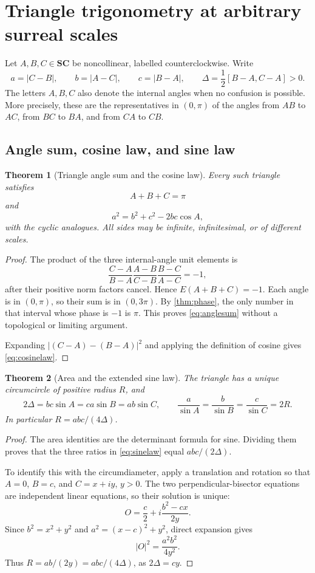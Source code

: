 \documentclass[11pt,letterpaper]{article}
\newtheorem{theorem}{Theorem}[section]
\theoremstyle{definition}
\theoremstyle{remark}
\newcommand{\SC}{\mathbf{SC}}
\numberwithin{equation}{section}
\begin{document}
\section{Triangle trigonometry at arbitrary surreal scales}\label{sec:triangles}
Let $A,B,C\in\SC$ be noncollinear, labelled counterclockwise. Write
\[
 a=|C-B|,\qquad b=|A-C|,\qquad c=|B-A|,
 \qquad \Delta=\frac12[B-A,C-A]>0.
\]
The letters $A,B,C$ also denote the internal angles when no confusion is possible. More precisely, these are the representatives in $(0,\pi)$ of the angles from $AB$ to $AC$, from $BC$ to $BA$, and from $CA$ to $CB$.

\subsection{Angle sum, cosine law, and sine law}
\begin{theorem}[Triangle angle sum and the cosine law]\label{thm:triangle}
Every such triangle satisfies
\begin{equation}\label{eq:anglesum}
 A+B+C=\pi
\end{equation}
and
\begin{equation}\label{eq:cosinelaw}
 a^2=b^2+c^2-2bc\cos A,
\end{equation}
with the cyclic analogues. All sides may be infinite, infinitesimal, or of different scales.
\end{theorem}
\begin{proof}
The product of the three internal-angle unit elements is
\[
 \frac{C-A}{B-A}\frac{A-B}{C-B}\frac{B-C}{A-C}=-1,
\]
after their positive norm factors cancel. Hence $E(A+B+C)=-1$. Each angle is in $(0,\pi)$, so their sum is in $(0,3\pi)$. By \cref{thm:phase}, the only number in that interval whose phase is $-1$ is $\pi$. This proves \eqref{eq:anglesum} without a topological or limiting argument.

Expanding $|(C-A)-(B-A)|^2$ and applying the definition of cosine gives \eqref{eq:cosinelaw}.
\end{proof}

\begin{theorem}[Area and the extended sine law]\label{thm:sinelaw}
The triangle has a unique circumcircle of positive radius $R$, and
\begin{equation}\label{eq:sinelaw}
 2\Delta=bc\sin A=ca\sin B=ab\sin C,
 \qquad
 \frac a{\sin A}=\frac b{\sin B}=\frac c{\sin C}=2R.
\end{equation}
In particular $R=abc/(4\Delta)$.
\end{theorem}
\begin{proof}
The area identities are the determinant formula for sine. Dividing them proves that the three ratios in \eqref{eq:sinelaw} equal $abc/(2\Delta)$.

To identify this with the circumdiameter, apply a translation and rotation so that $A=0$, $B=c$, and $C=x+iy$, $y>0$. The two perpendicular-bisector equations are independent linear equations, so their solution is unique:
\[
 O=\frac c2+i\frac{b^2-cx}{2y}.
\]
Since $b^2=x^2+y^2$ and $a^2=(x-c)^2+y^2$, direct expansion gives
\[
 |O|^2=\frac{a^2b^2}{4y^2}.
\]
Thus $R=ab/(2y)=abc/(4\Delta)$, as $2\Delta=cy$.
\end{proof}
\end{document}
